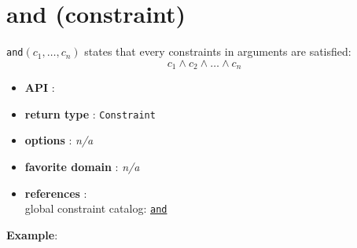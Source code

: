 \label{and}
\hypertarget{and}{}

\section{and (constraint)}\label{and:andconstraint}\hypertarget{and:andconstraint}{}
\begin{notedef}
  \texttt{and}$(c_1,\ldots,c_n)$ states that every constraints in arguments are satisfied:
$$ c_1 \land c_2 \land\ldots\land c_n$$
\end{notedef}

\begin{itemize}
\item \textbf{API} : 
\item \textbf{return type} : \texttt{Constraint}
\item \textbf{options} : \emph{n/a}
\item \textbf{favorite domain} : \emph{n/a}
\item \textbf{references} :\\
  global constraint catalog: \href{http://www.emn.fr/x-info/sdemasse/gccat/Cand.html}{\tt and}
\end{itemize}

\textbf{Example}:


